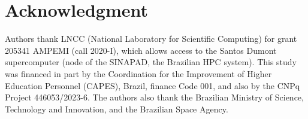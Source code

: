 \documentclass[conference]{IEEEtran}
\begin{document}
\section*{Acknowledgment}

Authors thank LNCC (National Laboratory for Scientific Computing) for grant 205341 AMPEMI (call 2020-I), which allows access to the Santos Dumont supercomputer (node of the SINAPAD, the Brazilian HPC system). This study was financed in part by the Coordination for the Improvement of Higher Education Personnel (CAPES), Brazil, finance Code 001, and also by the CNPq Project 446053/2023-6. The authors also thank the Brazilian Ministry of Science, Technology and Innovation, and the Brazilian Space Agency.




\end{document}
